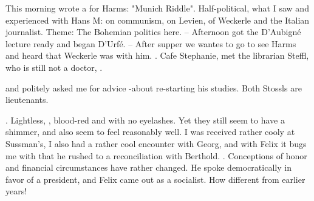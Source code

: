 
This morning wrote a  for Harms: "Munich Riddle". Half-political, what I saw and experienced with Hans M: on communism, on Levien, of Weckerle and the Italian journalist. Theme: The Bohemian politics here. -- Afternoon got the D'Aubigné lecture ready and began D'Urfé. -- After supper we wantes to go to see Harms and heard that Weckerle was with him. .  Cafe Stephanie, met the librarian Steffl, who is still not a doctor, . 

 and politely asked me for advice -about re-starting his studies.  Both Stossls are lieutenants. 

\missing

. Lightless, , blood-red and with no eyelashes. Yet they still seem to have a shimmer, and also seem to feel reasonably well. I was received rather cooly at Sussman's, I also had a rather cool encounter with Georg, and with Felix it bugs me with that he rushed to a reconciliation with Berthold. . Conceptions of honor and financial circumstances have rather changed. He spoke democratically in favor of a president, and Felix came out as a socialist. How different from earlier years!

